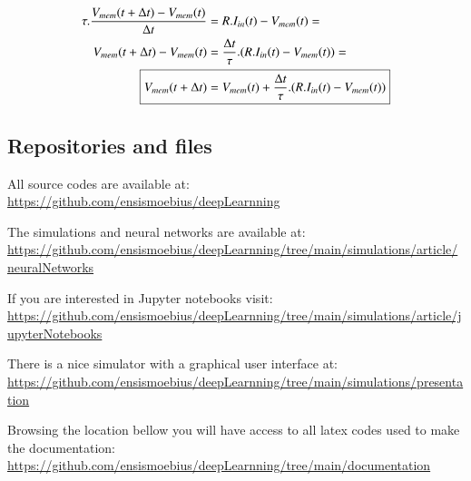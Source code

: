		\begin{equation}
			\label{eq:membraneDerivative}
			\begin{aligned}
				\tau.\dfrac{V_{mem}(t+\Delta t) - V_{mem}(t)}{\Delta t} &= R.I_{in}(t) - V_{mem}(t) = \\
				V_{mem}(t+\Delta t) - V_{mem}(t) &= \frac{\Delta t}{\tau} . (R.I_{in}(t) - V_{mem}(t)) = \\
				\Aboxed{V_{mem}(t+\Delta t) &= V_{mem}(t) + \frac{\Delta t}{\tau} . (R.I_{in}(t) - V_{mem}(t))}
			\end{aligned}
		\end{equation}

	\subsection{Repositories and files}
		\par All source codes are available at: \\ \href{https://github.com/ensismoebius/deepLearnning}{https://github.com/ensismoebius/deepLearnning}
		\par The simulations and neural networks are available at: \\ \href{https://github.com/ensismoebius/deepLearnning/tree/main/simulations/article/neuralNetworks}{https://github.com/ensismoebius/deepLearnning/tree/main/simulations/article/neuralNetworks}
		\par If you are interested in Jupyter notebooks visit: \\
		\href{https://github.com/ensismoebius/deepLearnning/tree/main/simulations/article/jupyterNotebooks}{https://github.com/ensismoebius/deepLearnning/tree/main/simulations/article/jupyterNotebooks} 
		\par There is a nice simulator with a graphical user interface at: \\
		\href{https://github.com/ensismoebius/deepLearnning/tree/main/simulations/presentation}{https://github.com/ensismoebius/deepLearnning/tree/main/simulations/presentation}
		\par Browsing the location bellow you will have access to all latex codes used to make the documentation:\\
		\href{https://github.com/ensismoebius/deepLearnning/tree/main/documentation}{https://github.com/ensismoebius/deepLearnning/tree/main/documentation}
	
	
	
	
